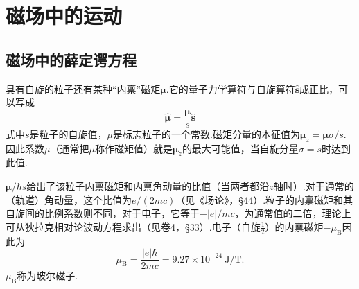%
%
\chapter{磁场中的运动}

\section{磁场中的薛定谔方程}

具有自旋的粒子还有某种“内禀”磁矩$\boldsymbol{\mu}$.它的量子力学算符与自旋算符$\hat{\boldsymbol{s}}$成正比，可以写成
\begin{equation}
  \hat{\boldsymbol{\mu}}=\frac{\boldsymbol{\mu}}{s}\hat{\boldsymbol{s}}
\end{equation}
式中$s$是粒子的自旋值，$\mu$是标志粒子的一个常数.磁矩分量的本征值为$\boldsymbol{\mu}_z=\boldsymbol{\mu}\sigma/s$.因此系数$\mu$（通常把$\mu$称作磁矩值）就是$\boldsymbol{\mu}_z$的最大可能值，当自旋分量$\sigma=s$时达到此值.

$\boldsymbol{\mu}/\hbar s$给出了该粒子内禀磁矩和内禀角动量的比值（当两者都沿$z$轴时）.对于通常的（轨道）角动量，这个比值为$e/(2mc)$（见《场论》，§44）.粒子的内禀磁矩和其自旋间的比例系数则不同，对于电子，它等于$-|e|/mc$，为通常值的二倍，理论上可从狄拉克相对论波动方程求出（见卷4，§33）.电子（自旋$\frac{1}{2}$）的内禀磁矩$-\mu_\mathrm{B}$因此为
\begin{equation}
  \mu_\mathrm{B}=\frac{|e|\hbar}{2mc}=9.27\times10^{-24}\ \mathrm{J/T}.
\end{equation}
$\mu_\mathrm{B}$称为玻尔磁子.

